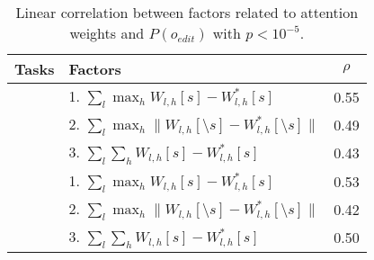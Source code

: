 
\begin{wraptable}{R}{0.5\textwidth}
    \centering
    \small
    \vspace{-3pt}
    \caption{Linear correlation between factors related to attention weights and $P(o_{edit})$ with $p<10^{-5}$.}
    \tiny
    \begin{adjustbox}{width=0.5\textwidth}
    \begin{tabular}{l|lc}
    \toprule
    \bf Tasks & \bf Factors & \bf $\rho$ \\
    \midrule
    & 1. $\sum_l \max_{h} W_{l,h}[s] - W_{l,h}^*[s]$ & 0.55 \\
    & 2. $\sum_l \max_{h} \|W_{l,h}[\setminus s] - W_{l,h}^*[\setminus s]\|$ & 0.49 \\
    & 3. $\sum_l \sum_{h} W_{l,h}[s] - W_{l,h}^*[s]$ & 0.43 \\
    \midrule
    & 1. $\sum_l \max_{h} W_{l,h}[s] - W_{l,h}^*[s]$ & 0.53 \\
    & 2. $\sum_l \max_{h} \|W_{l,h}[\setminus s] - W_{l,h}^*[\setminus s]\|$ & 0.42 \\
    & 3. $\sum_l \sum_{h} W_{l,h}[s] - W_{l,h}^*[s]$ & 0.50 \\
    \bottomrule
    \end{tabular}
    \end{adjustbox}
    \label{tab:w_correlation}
\end{wraptable}

